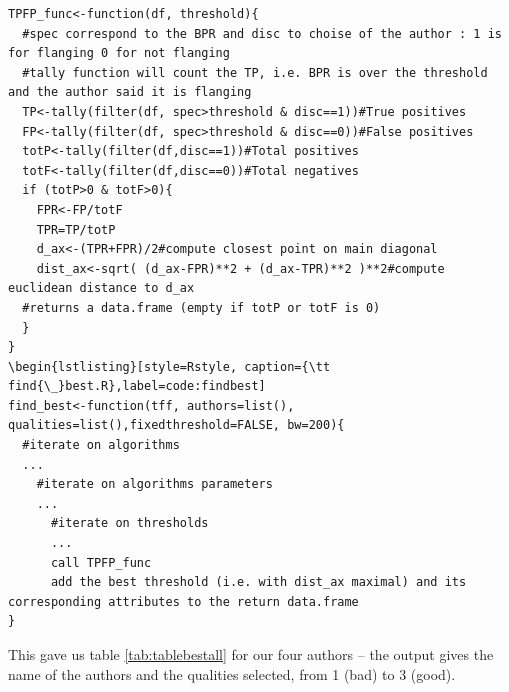 \documentclass{article}\usepackage[]{graphicx}\usepackage[]{color}
\begin{document}
\begin{lstlisting}[style=Rstyle, caption={\tt TPFP{\_}func.R},label=code:TPFPfunc]
TPFP_func<-function(df, threshold){
  #spec correspond to the BPR and disc to choise of the author : 1 is for flanging 0 for not flanging
  #tally function will count the TP, i.e. BPR is over the threshold and the author said it is flanging
  TP<-tally(filter(df, spec>threshold & disc==1))#True positives
  FP<-tally(filter(df, spec>threshold & disc==0))#False positives
  totP<-tally(filter(df,disc==1))#Total positives
  totF<-tally(filter(df,disc==0))#Total negatives
  if (totP>0 & totF>0){
    FPR<-FP/totF
    TPR=TP/totP
    d_ax<-(TPR+FPR)/2#compute closest point on main diagonal
    dist_ax<-sqrt( (d_ax-FPR)**2 + (d_ax-TPR)**2 )**2#compute euclidean distance to d_ax
  #returns a data.frame (empty if totP or totF is 0)
  }
}
\begin{lstlisting}[style=Rstyle, caption={\tt find{\_}best.R},label=code:findbest]
find_best<-function(tff, authors=list(), qualities=list(),fixedthreshold=FALSE, bw=200){
  #iterate on algorithms
  ...
    #iterate on algorithms parameters
    ...
      #iterate on thresholds
      ...
      call TPFP_func
      add the best threshold (i.e. with dist_ax maximal) and its corresponding attributes to the return data.frame
}
\end{lstlisting}

This gave us table \ref{tab:tablebestall} for our four authors -- the output gives the name of the authors and the qualities selected, from 1 (bad) to 3 (good).
\end{document}
